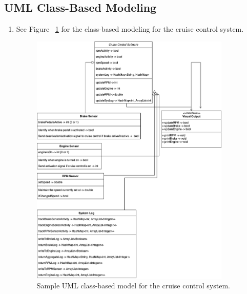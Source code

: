 \documentclass[preprint,11pt,3p]{article}
\begin{document}
\subsection{UML Class-Based Modeling}
\begin{enumerate}
	\item See Figure ~\ref{fig:classUML} for the class-based modeling for the cruise control system.
		\begin{figure}[H]
			\includegraphics[width=0.9\textwidth]{images/classUML.png}
			\caption{Sample UML class-based model for the cruise control system.}
			\label{fig:classUML}
		\end{figure}
\end{enumerate}
\end{document}
